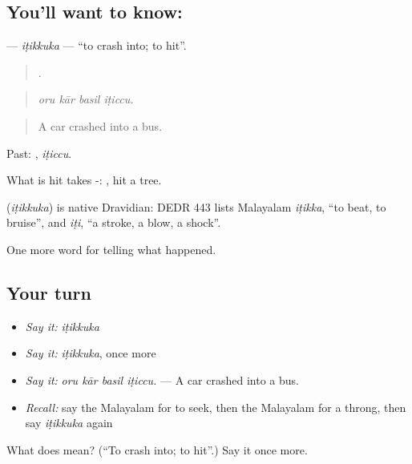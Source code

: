 \subsection*{You'll want to know: }
\textbf{} — \emph{iṭikkuka} — \textquotedblleft{}to crash into; to hit\textquotedblright{}.

\begin{quote}
   .
\end{quote}

\begin{quote}
\emph{oru kār basil iṭiccu.}
\end{quote}

\begin{quote}
A car crashed into a bus.
\end{quote}

Past: , \emph{iṭiccu}.

What is hit takes -:  , hit a tree.

\begin{cousinweb}
\textbf{} (\emph{iṭikkuka}) is native Dravidian: DEDR 443 lists Malayalam \emph{iṭikka}, \textquotedblleft{}to beat, to bruise\textquotedblright{}, and \emph{iṭi}, \textquotedblleft{}a stroke, a blow, a shock\textquotedblright{}.
\end{cousinweb}

\begin{grammarlens}[title={What you've built}]
One more word for telling what happened.
\end{grammarlens}

\subsection*{Your turn}
\begin{itemize}
\raggedright
  \item \emph{Say it:} \emph{iṭikkuka}
  \item \emph{Say it:} \emph{iṭikkuka}, once more
  \item \emph{Say it:} \emph{oru kār basil iṭiccu.} — A car crashed into a bus.
  \item \emph{Recall:} say the Malayalam for to seek, then the Malayalam for a throng, then say \emph{iṭikkuka} again
\end{itemize}

\begin{tcolorbox}[breakable,colback=teal!4,colframe=teal!35!black,title={Before you move on}]
What does  mean? (\textquotedblleft{}To crash into; to hit\textquotedblright{}.) Say it once more.
\end{tcolorbox}
